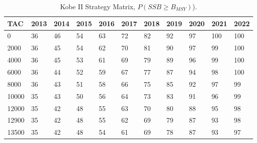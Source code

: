 \documentclass[a4paper, 10pt]{article}
\begin{document}
%
\begin{table}[!tbp]
\caption{Kobe II Strategy Matrix, $P(SSB\geq B_{MSY})$).\label{kobeShade}} 
\begin{center}
\begin{tabular}{lllllllllll}
\hline\hline
\multicolumn{1}{l}{TAC}&\multicolumn{1}{c}{2013}&\multicolumn{1}{c}{2014}&\multicolumn{1}{c}{2015}&\multicolumn{1}{c}{2016}&\multicolumn{1}{c}{2017}&\multicolumn{1}{c}{2018}&\multicolumn{1}{c}{2019}&\multicolumn{1}{c}{2020}&\multicolumn{1}{c}{2021}&\multicolumn{1}{c}{2022}\tabularnewline
\hline
0& 36& 46&\cellcolor{gray90} 54&\cellcolor{gray80} 63&\cellcolor{gray70} 72&\cellcolor{gray60} 82&\cellcolor{gray50} 92&\cellcolor{gray50} 97&\cellcolor{gray50} 100&\cellcolor{gray50} 100\tabularnewline
2000& 36& 45&\cellcolor{gray90} 54&\cellcolor{gray80} 62&\cellcolor{gray70} 70&\cellcolor{gray60} 81&\cellcolor{gray50} 90&\cellcolor{gray50} 97&\cellcolor{gray50} 99&\cellcolor{gray50} 100\tabularnewline
4000& 36& 45&\cellcolor{gray90} 53&\cellcolor{gray80} 61&\cellcolor{gray80} 69&\cellcolor{gray70} 79&\cellcolor{gray60} 89&\cellcolor{gray50} 96&\cellcolor{gray50} 99&\cellcolor{gray50} 100\tabularnewline
6000& 36& 44&\cellcolor{gray90} 52&\cellcolor{gray90} 59&\cellcolor{gray80} 67&\cellcolor{gray70} 77&\cellcolor{gray60} 87&\cellcolor{gray50} 94&\cellcolor{gray50} 98&\cellcolor{gray50} 100\tabularnewline
8000& 36& 43&\cellcolor{gray90} 51&\cellcolor{gray90} 58&\cellcolor{gray80} 66&\cellcolor{gray70} 75&\cellcolor{gray60} 85&\cellcolor{gray50} 92&\cellcolor{gray50} 97&\cellcolor{gray50} 99\tabularnewline
10000& 35& 43& 50&\cellcolor{gray90} 56&\cellcolor{gray80} 64&\cellcolor{gray70} 73&\cellcolor{gray60} 83&\cellcolor{gray50} 91&\cellcolor{gray50} 96&\cellcolor{gray50} 99\tabularnewline
12000& 35& 42& 48&\cellcolor{gray90} 55&\cellcolor{gray80} 63&\cellcolor{gray70} 70&\cellcolor{gray70} 80&\cellcolor{gray60} 88&\cellcolor{gray50} 95&\cellcolor{gray50} 98\tabularnewline
12900& 35& 42& 48&\cellcolor{gray90} 55&\cellcolor{gray80} 62&\cellcolor{gray80} 69&\cellcolor{gray70} 79&\cellcolor{gray60} 87&\cellcolor{gray50} 93&\cellcolor{gray50} 98\tabularnewline
13500& 35& 42& 48&\cellcolor{gray90} 54&\cellcolor{gray80} 61&\cellcolor{gray80} 69&\cellcolor{gray70} 78&\cellcolor{gray60} 87&\cellcolor{gray50} 93&\cellcolor{gray50} 97\tabularnewline

\end{tabular}
\end{center}
\end{table}
\end{document}
